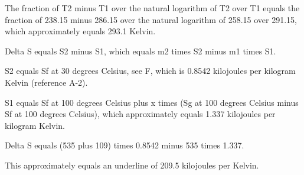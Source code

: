 The fraction of T2 minus T1 over the natural logarithm of T2 over T1 equals the fraction of 238.15 minus 286.15 over the natural logarithm of 258.15 over 291.15, which approximately equals 293.1 Kelvin.

Delta S equals S2 minus S1, which equals m2 times S2 minus m1 times S1.

S2 equals Sf at 30 degrees Celsius, see F, which is 0.8542 kilojoules per kilogram Kelvin (reference A-2).

S1 equals Sf at 100 degrees Celsius plus x times (Sg at 100 degrees Celsius minus Sf at 100 degrees Celsius), which approximately equals 1.337 kilojoules per kilogram Kelvin.

Delta S equals (535 plus 109) times 0.8542 minus 535 times 1.337.

This approximately equals an underline of 209.5 kilojoules per Kelvin.